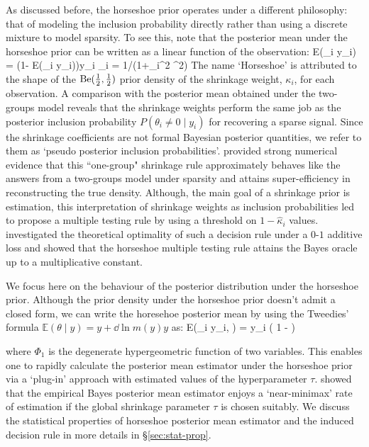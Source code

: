 \documentclass[11pt]{article}
\renewcommand{\E}{\mathbb E}
\numberwithin{equation}{section}
\begin{document}
As discussed before, the horseshoe prior operates under a different philosophy: that of modeling the inclusion probability directly rather than using a discrete mixture to model sparsity. To see this, note that the posterior mean under the horseshoe prior can be written as a linear function of the observation:
\beq
\E(\theta_i \mid y_i) = (1- \E(\kappa_i \mid y_i))y_i  \kappa_i = 1/(1+\lambda_i^2 \tau^2)
\eeq
The name `Horseshoe' is attributed to the shape of the ${\rm Be} (\frac{1}{2}, \frac{1}{2})$ prior density of the shrinkage weight, $\kappa_i$, for each observation. A comparison with the posterior mean obtained under the two-groups model reveals that the shrinkage weights perform the same job as the posterior inclusion probability $P(\theta_i \ne 0 \mid y_i)$ for recovering a sparse signal. Since the shrinkage coefficients are not formal Bayesian posterior quantities, we refer to them as `pseudo posterior inclusion probabilities'. \citet{carvalho2010horseshoe} provided strong numerical evidence that this ``one-group" shrinkage rule approximately behaves like the answers from a two-groups model under sparsity and attains super-efficiency in reconstructing the true density. Although, the main goal of a shrinkage prior is estimation, this interpretation of shrinkage weights as inclusion probabilities led \citet{carvalho2010horseshoe} to propose a multiple testing rule by using a threshold on $1-\hat{\kappa}_i$ values. \citet{datta2013asymptotic} investigated the theoretical optimality of such a decision rule under a $0$-$1$ additive loss and showed that the horseshoe multiple testing rule attains the Bayes oracle up to a multiplicative constant. 

We focus here on the behaviour of the posterior distribution under the horseshoe prior. Although the prior density under the horseshoe prior doesn't admit a closed form, we can write the horesehoe posterior mean by using the Tweedies' formula $\E(\theta \mid y) = y + \dd{\ln m(y)}{y}$ as: 
\beq
\E(\theta_i \mid y_i, \tau) = y_i \left( 1 -  \right)
\eeq

where $\Phi_1$ is the degenerate hypergeometric function of two variables. This enables one to rapidly calculate the posterior mean estimator under the horseshoe prior via a `plug-in' approach with estimated values of the hyperparameter $\tau$. \citet{van2014horseshoe} showed that the empirical Bayes posterior mean estimator enjoys  a `near-minimax' rate of estimation if the global shrinkage parameter $\tau$ is chosen suitably. We discuss the statistical properties of horseshoe posterior mean estimator and the induced decision rule in more details in \S \ref{sec:stat-prop}. 
\end{document}
